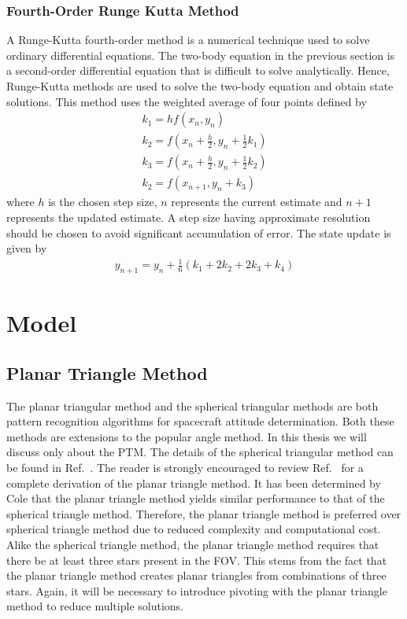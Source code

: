 \documentclass[]{aiaa-tc}%
\begin{document}
\subsubsection{Fourth-Order Runge Kutta Method}

A Runge-Kutta fourth-order method is a numerical technique used to solve ordinary differential equations. The two-body equation in the previous section is a second-order differential equation that is difficult to solve analytically. Hence, Runge-Kutta methods are used to solve the two-body equation and obtain state solutions. This method uses the weighted average of four points defined by \cite{greenberg_advanced_1998}
\begin{subequations}
\begin{gather}
\label{eq:range_kutta}
k_1=hf(x_n,y_n)\\
k_2=f(x_n+\frac{h}{2},y_n+\frac{1}{2}k_1)\\
k_3=f(x_n+\frac{h}{2},y_n+\frac{1}{2}k_2)\\
k_2=f(x_{n+1},y_n+k_3)
\end{gather}
\end{subequations}
where $h$ is the chosen step size, $n$ represents the current estimate and $n+1$ represents the updated estimate. A step size having approximate resolution should be chosen to avoid significant accumulation of error. The state update is given by
\begin{align}
y_{n+1}=y_n+\frac{1}{6}(k_1+2k_2+2k_3+k_4)
\end{align}
\section{Model}
\label{model}

\subsection{Planar Triangle Method}

The planar triangular method and the spherical triangular methods are both pattern recognition algorithms for spacecraft attitude determination. Both these methods are extensions to the popular angle method. In this thesis we will discuss only about the PTM. The details of the spherical triangular method can be found in Ref.~. The reader is strongly encouraged to review Ref.~ for a complete derivation of the planar triangle method. It has been determined by Cole that the planar triangle method yields similar performance to that of the spherical triangle method\cite{PTM}. Therefore, the planar triangle method is preferred over spherical triangle method due to reduced complexity and computational cost. Alike the spherical triangle method, the planar triangle method requires that there be at least three stars present in the FOV. This stems from the fact that the planar triangle method creates planar triangles from combinations of three stars. Again, it will be necessary to introduce pivoting with the planar triangle method to reduce multiple solutions.\\
\end{document}
